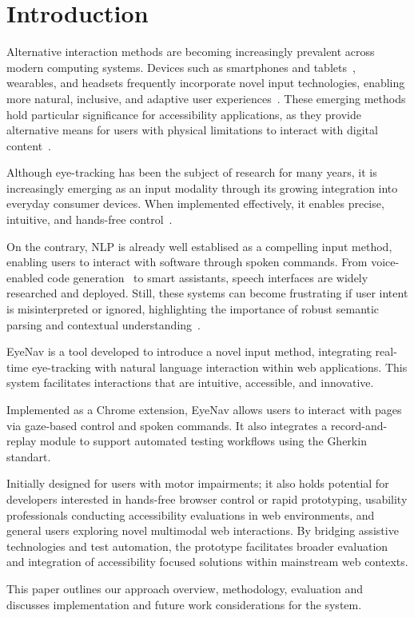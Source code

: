 
\section{Introduction}

Alternative interaction methods are becoming increasingly prevalent across modern computing systems. 
Devices such as smartphones and tablets~\cite{apple2024accessibility, honor_magic6pro_specs}, wearables\cite{tobii_glasses_x}, and headsets\cite{apple_vision_pro_2025,playstation_vr2_specs,vive_pro2_2025} frequently incorporate novel input technologies, enabling more natural, inclusive, and adaptive user experiences~\cite{dondi2023gazehci, fernandes2023eyevr}.
These emerging methods hold particular significance for accessibility applications, as they provide alternative means for users with physical limitations to interact with digital content~\cite{hsieh2024increasing}.

Although eye-tracking has been the subject of research for many years\cite{gips1996eagleeyes}, it is increasingly emerging as an input modality through its growing integration into everyday consumer devices. When implemented effectively, it enables precise, intuitive, and hands-free control~\cite{huang2024visionpro}.

On the contrary, \ac{NLP} is already well establised as a compelling input method, enabling users to interact with software through spoken commands. 
From voice-enabled code generation~\cite{serenade2025} to smart assistants, speech interfaces are widely researched and deployed. Still, these systems can become frustrating if user intent is misinterpreted or ignored, highlighting the importance of robust semantic parsing and contextual understanding~\cite{mozafari2020chatbot, liu2024chatgpt}. 

EyeNav is a tool developed to introduce a novel input method, integrating real-time eye-tracking with natural language interaction within web applications. This system facilitates interactions that are intuitive, accessible, and innovative.

Implemented as a Chrome extension, EyeNav allows users to interact with pages via gaze-based control and spoken commands. It also integrates a record-and-replay module to support automated testing workflows using the Gherkin standart.

Initially designed for users with motor impairments; it also holds potential for developers interested in hands-free browser control or rapid prototyping, usability professionals conducting accessibility evaluations in web environments, and general users exploring novel multimodal web interactions. By bridging assistive technologies and test automation, the prototype facilitates broader evaluation and integration of accessibility focused solutions within mainstream web contexts.

This paper outlines our approach overview, methodology, evaluation and discusses implementation and future work considerations for the system.
